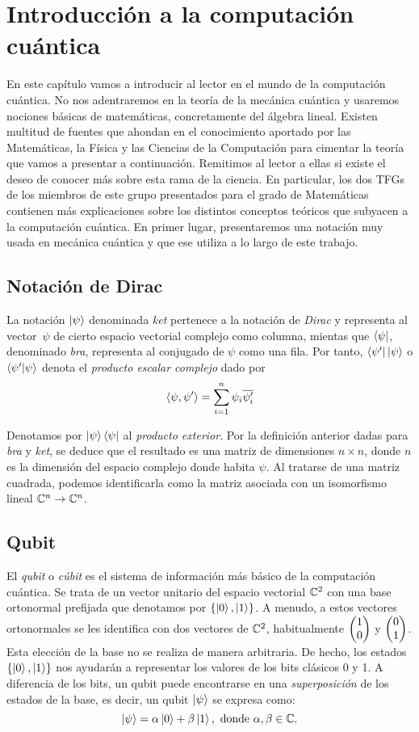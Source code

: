 \chapter{Introducción a la computación cuántica}

En este capítulo vamos a introducir al lector en el mundo de la computación cuántica. No nos adentraremos en la teoría de la mecánica cuántica y usaremos nociones básicas de matemáticas, concretamente del álgebra lineal. Existen multitud de fuentes que ahondan en el conocimiento aportado por las Matemáticas, la Física y las Ciencias de la Computación para cimentar la teoría que vamos a presentar a continuación. Remitimos al lector a ellas si existe el deseo de conocer más sobre esta rama de la ciencia. En particular,  los dos TFGs de los miembros de este grupo presentados para el grado de Matemáticas contienen más explicaciones sobre los distintos conceptos teóricos que subyacen a la computación cuántica.
%
En primer lugar, presentaremos una notación muy usada en mecánica cuántica y que ese utiliza a lo largo de este trabajo.

\section{Notación de Dirac}
La notación $\left|\psi\right\rangle$ denominada \textit{ket} pertenece a la notación de \textit{Dirac} y representa al vector~$\psi$ de cierto espacio vectorial complejo como columna, mientas que $\left\langle\psi\right|$, denominado \textit{bra}, representa al conjugado de $\psi$ como una fila. Por tanto, $\left\langle\psi'\right|\left|\psi\right\rangle$ o $\left\langle\psi'|\psi\right\rangle$ denota el \textit{producto escalar complejo} dado por
$$\langle\psi,\psi'\rangle=\sum_{i=1}^{n}\psi_i\overline{\psi'_i}
$$

Denotamos por $\left|\psi\right\rangle\left\langle\psi\right|$ al \textit{producto exterior}. Por la definición anterior dadas para \textit{bra} y \textit{ket}, se deduce que el resultado es una matriz de dimensiones $n\times n$, donde $n$ es la dimensión del espacio complejo donde habita $\psi$. Al tratarse de una matriz cuadrada, podemos identificarla como la matriz asociada con un isomorfismo lineal $\mathbb{C}^n\to\mathbb{C}^n$.

\section{Qubit}

El \textit{qubit} o \textit{cúbit} es el sistema de información más básico de la computación cuántica. Se trata de un vector unitario del espacio vectorial $\mathbb{C}^2$ con una base ortonormal prefijada que denotamos por $\{\left|0\right\rangle,\left|1\right\rangle\}$. A menudo, a estos vectores ortonormales se les identifica con dos vectores de $\mathbb{C}^2$, habitualmente $\begin{pmatrix} 1 \\ 0 \end{pmatrix}$ y $\begin{pmatrix} 0 \\ 1 \end{pmatrix}$.
%
Esta elección de la base no se realiza de manera arbitraria. De hecho,  los estados $\{\left|0\right\rangle,\left|1\right\rangle\}$ nos ayudarán a representar los valores de los bits clásicos 0 y 1. A diferencia de los bits, un qubit puede encontrarse en una \textit{superposición} de los estados de la base, es decir, un qubit $\left|\psi\right\rangle$ se expresa como:
$$\ket{\psi}=\alpha\ket0+\beta\ket1,\mathrm{\ donde\ }\alpha,\beta\in\C.
$$

